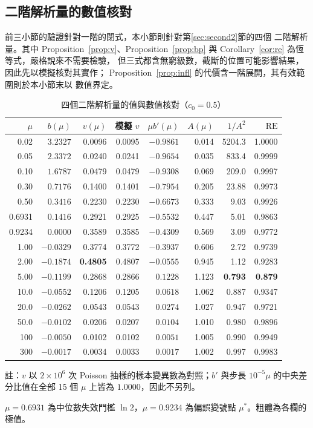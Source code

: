 \documentclass[UTF8, fontset=macnew, a4paper, 12pt]{ctexart}
\begin{document}
\subsection{二階解析量的數值核對}\label{sec:vcheck}\label{sec:vsd}\label{sec:vinfl}

前三小節的驗證針對一階的閉式，本小節則針對第\ref{sec:second2}節的四個
二階解析量。其中 Proposition~\ref{prop:v}、Proposition~\ref{prop:bp} 與
Corollary~\ref{cor:re} 為恆等式，嚴格說來不需要檢驗，
但三式都含無窮級數，截斷的位置可能影響結果，因此先以模擬核對其實作；
Proposition~\ref{prop:infl} 的代價含一階展開，其有效範圍則於本小節末以
數值界定。

\begin{table}[H]
\centering
\caption{四個二階解析量的值與數值核對（$c_0=0.5$）}
\small
\begin{tabular}{rrrrrrrr}
\toprule
$\mu$ & $b(\mu)$ & $v(\mu)$ & 模擬 $v$ & $\mu b'(\mu)$ & $A(\mu)$ & $1/A^2$ & $\mathrm{RE}$\\
\midrule
0.02   & $3.2327$  & 0.0096 & 0.0095 & $-0.9861$ & 0.014 & 5204.3 & 1.0000\\
0.05   & $2.3372$  & 0.0240 & 0.0241 & $-0.9654$ & 0.035 & 833.4  & 0.9999\\
0.10   & $1.6787$  & 0.0479 & 0.0479 & $-0.9308$ & 0.069 & 209.0  & 0.9997\\
0.30   & $0.7176$  & 0.1400 & 0.1401 & $-0.7954$ & 0.205 & 23.88  & 0.9973\\
0.50   & $0.3416$  & 0.2230 & 0.2230 & $-0.6673$ & 0.333 & 9.03   & 0.9926\\
0.6931 & $0.1416$  & 0.2921 & 0.2925 & $-0.5532$ & 0.447 & 5.01   & 0.9863\\
0.9234 & $0.0000$  & 0.3589 & 0.3585 & $-0.4309$ & 0.569 & 3.09   & 0.9772\\
1.00   & $-0.0329$ & 0.3774 & 0.3772 & $-0.3937$ & 0.606 & 2.72   & 0.9739\\
2.00   & $-0.1874$ & \textbf{0.4805} & 0.4807 & $-0.0555$ & 0.945 & 1.12 & 0.9283\\
5.00   & $-0.1199$ & 0.2868 & 0.2866 & $0.1228$ & 1.123 & \textbf{0.793} & \textbf{0.879}\\
10.0   & $-0.0552$ & 0.1206 & 0.1205 & $0.0618$ & 1.062 & 0.887 & 0.9347\\
20.0   & $-0.0262$ & 0.0543 & 0.0543 & $0.0274$ & 1.027 & 0.947 & 0.9721\\
50.0   & $-0.0102$ & 0.0206 & 0.0207 & $0.0104$ & 1.010 & 0.980 & 0.9896\\
100    & $-0.0050$ & 0.0102 & 0.0102 & $0.0051$ & 1.005 & 0.990 & 0.9949\\
300    & $-0.0017$ & 0.0034 & 0.0033 & $0.0017$ & 1.002 & 0.997 & 0.9983\\
\bottomrule
\end{tabular}

{\footnotesize 註：$v$ 以 $2\times10^{6}$ 次 Poisson 抽樣的樣本變異數為對照；$b'$ 與步長 $10^{-5}\mu$ 的中央差分比值在全部 15 個 $\mu$ 上皆為 $1.0000$，因此不另列。}


\vspace{3pt}
{\footnotesize $\mu=0.6931$ 為中位數失效門檻 $\ln2$，$\mu=0.9234$ 為偏誤變號點
$\mu^{\ast}$。粗體為各欄的極值。}
\label{tab:v1}
\end{table}
\end{document}

